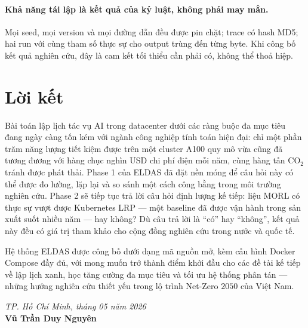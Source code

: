 \paragraph{Khả năng tái lập là kết quả của kỷ luật, không phải may mắn.}
Mọi seed, mọi version và mọi đường dẫn đều được pin chặt; trace có
hash MD5; hai run với cùng tham số thực sự cho output trùng đến từng
byte. Khi công bố kết quả nghiên cứu, đây là cam kết tối thiểu cần
phải có, không thể thoả hiệp.

\section{Lời kết}
\label{sec:loi-ket}

Bài toán lập lịch tác vụ AI trong datacenter dưới các ràng buộc đa
mục tiêu đang ngày càng tốn kém với ngành công nghiệp tính toán
hiện đại: chỉ một phần trăm năng lượng tiết kiệm được trên một
cluster A100 quy mô vừa cũng đã tương đương với hàng chục nghìn USD
chi phí điện mỗi năm, cùng hàng tấn $\mathrm{CO_2}$ tránh được phát
thải. Phase 1 của ELDAS đã đặt nền móng để câu hỏi này có thể được
đo lường, lặp lại và so sánh một cách công bằng trong môi trường
nghiên cứu. Phase 2 sẽ tiếp tục trả lời câu hỏi định lượng kế tiếp:
liệu MORL có thực sự vượt được Kubernetes LRP --- một baseline đã
được vận hành trong sản xuất suốt nhiều năm --- hay không? Dù câu
trả lời là ``có'' hay ``không'', kết quả này đều có giá trị tham
khảo cho cộng đồng nghiên cứu trong nước và quốc tế.

\bigskip
\noindent
Hệ thống ELDAS được công bố dưới dạng mã nguồn mở, kèm cấu hình
Docker Compose đầy đủ, với mong muốn trở thành điểm khởi đầu cho
các đề tài kế tiếp về lập lịch xanh, học tăng cường đa mục tiêu và
tối ưu hệ thống phân tán --- những hướng nghiên cứu thiết yếu trong
lộ trình Net-Zero $2050$ của Việt Nam.

\begin{flushright}
\textit{TP. Hồ Chí Minh, tháng 05 năm 2026}\\
\textbf{Vũ Trần Duy Nguyên}
\end{flushright}
